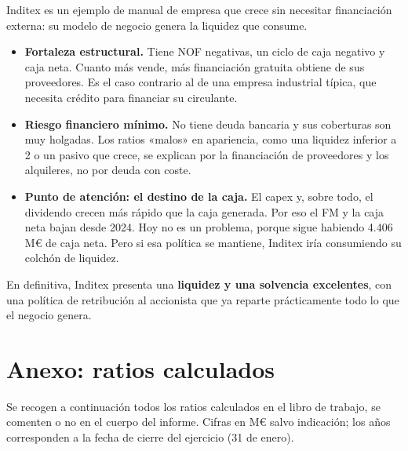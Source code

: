 \documentclass[11pt,a4paper]{article}
\newcommand{\idea}[1]{\begin{ideabox}#1\end{ideabox}}
\begin{document}
\idea{Inditex es un ejemplo de manual de empresa que crece sin necesitar financiación externa: su modelo de
negocio genera la liquidez que consume.}

\begin{itemize}
  \item \textbf{Fortaleza estructural.} Tiene NOF negativas, un ciclo de caja negativo y caja neta. Cuanto más
        vende, más financiación gratuita obtiene de sus proveedores. Es el caso contrario al de una empresa
        industrial típica, que necesita crédito para financiar su circulante.
  \item \textbf{Riesgo financiero mínimo.} No tiene deuda bancaria y sus coberturas son muy holgadas. Los ratios
        «malos» en apariencia, como una liquidez inferior a 2 o un pasivo que crece, se explican por la
        financiación de proveedores y los alquileres, no por deuda con coste.
  \item \textbf{Punto de atención: el destino de la caja.} El capex y, sobre todo, el dividendo crecen más rápido
        que la caja generada. Por eso el FM y la caja neta bajan desde 2024. Hoy no es un problema, porque
        sigue habiendo 4.406 M€ de caja neta. Pero si esa política se mantiene, Inditex iría consumiendo su
        colchón de liquidez.
\end{itemize}

En definitiva, Inditex presenta una \textbf{liquidez y una solvencia excelentes}, con una política de
retribución al accionista que ya reparte prácticamente todo lo que el negocio genera.

\clearpage
\appendix
\renewcommand{\thesection}{\Alph{section}}
\section{Anexo: ratios calculados}

Se recogen a continuación todos los ratios calculados en el libro de trabajo, se comenten o no en el
cuerpo del informe. Cifras en M€ salvo indicación; los años corresponden a la fecha de cierre del
ejercicio (31 de enero).
\end{document}

